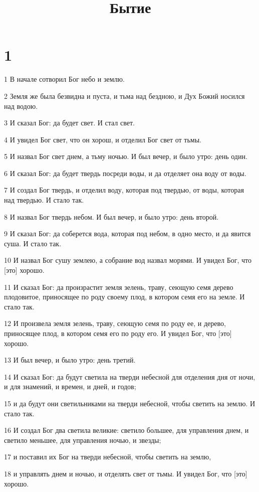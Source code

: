 

\title{Бытие}


\chapter{1}

\par 1 В начале сотворил Бог небо и землю.
\par 2 Земля же была безвидна и пуста, и тьма над бездною, и Дух Божий носился над водою.
\par 3 И сказал Бог: да будет свет. И стал свет.
\par 4 И увидел Бог свет, что он хорош, и отделил Бог свет от тьмы.
\par 5 И назвал Бог свет днем, а тьму ночью. И был вечер, и было утро: день один.
\par 6 И сказал Бог: да будет твердь посреди воды, и да отделяет она воду от воды.
\par 7 И создал Бог твердь, и отделил воду, которая под твердью, от воды, которая над твердью. И стало так.
\par 8 И назвал Бог твердь небом. И был вечер, и было утро: день второй.
\par 9 И сказал Бог: да соберется вода, которая под небом, в одно место, и да явится суша. И стало так.
\par 10 И назвал Бог сушу землею, а собрание вод назвал морями. И увидел Бог, что [это] хорошо.
\par 11 И сказал Бог: да произрастит земля зелень, траву, сеющую семя дерево плодовитое, приносящее по роду своему плод, в котором семя его на земле. И стало так.
\par 12 И произвела земля зелень, траву, сеющую семя по роду ее, и дерево, приносящее плод, в котором семя его по роду его. И увидел Бог, что [это] хорошо.
\par 13 И был вечер, и было утро: день третий.
\par 14 И сказал Бог: да будут светила на тверди небесной для отделения дня от ночи, и для знамений, и времен, и дней, и годов;
\par 15 и да будут они светильниками на тверди небесной, чтобы светить на землю. И стало так.
\par 16 И создал Бог два светила великие: светило большее, для управления днем, и светило меньшее, для управления ночью, и звезды;
\par 17 и поставил их Бог на тверди небесной, чтобы светить на землю,
\par 18 и управлять днем и ночью, и отделять свет от тьмы. И увидел Бог, что [это] хорошо.
